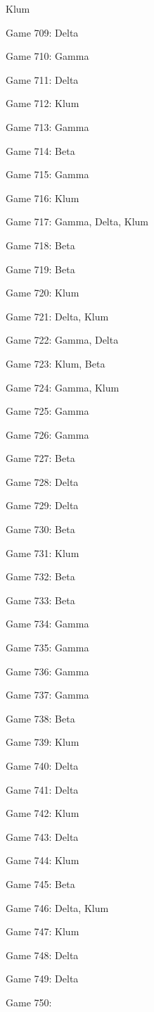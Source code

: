 \documentclass{article}
\begin{document}
\begin{multicols}{3}
\begin{compactitem}
Klum
\item Game 709:
Delta
\item Game 710:
Gamma
\item Game 711:
Delta
\item Game 712:
Klum
\item Game 713:
Gamma
\item Game 714:
Beta
\item Game 715:
Gamma
\item Game 716:
Klum
\item Game 717:
Gamma, Delta, Klum
\item Game 718:
Beta
\item Game 719:
Beta
\item Game 720:
Klum
\item Game 721:
Delta, Klum
\item Game 722:
Gamma, Delta
\item Game 723:
Klum, Beta
\item Game 724:
Gamma, Klum
\item Game 725:
Gamma
\item Game 726:
Gamma
\item Game 727:
Beta
\item Game 728:
Delta
\item Game 729:
Delta
\item Game 730:
Beta
\item Game 731:
Klum
\item Game 732:
Beta
\item Game 733:
Beta
\item Game 734:
Gamma
\item Game 735:
Gamma
\item Game 736:
Gamma
\item Game 737:
Gamma
\item Game 738:
Beta
\item Game 739:
Klum
\item Game 740:
Delta
\item Game 741:
Delta
\item Game 742:
Klum
\item Game 743:
Delta
\item Game 744:
Klum
\item Game 745:
Beta
\item Game 746:
Delta, Klum
\item Game 747:
Klum
\item Game 748:
Delta
\item Game 749:
Delta
\item Game 750:

\end{compactitem}
\end{multicols}
\end{document}
